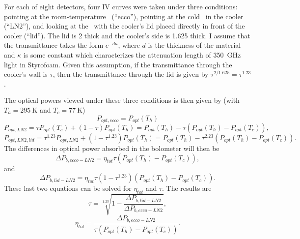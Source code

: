 For each of eight detectors, four IV curves were taken under three conditions: pointing at the room-temperature \ecco\ (``ecco''), pointing at the cold \ecco\ in the cooler (``LN2''), and looking at the \ecco\ with the cooler's lid placed directly in front of the cooler (``lid'').
The lid is \SI{2}{\in} thick and the cooler's side is \SI{1.625}{\in} thick.
I assume that the transmittance takes the form $e^{-d \kappa}$, where $d$ is the thickness of the material and $\kappa$ is some constant which characterizes the attenuation length of \SI{350}{\GHz} light in Styrofoam.
Given this assumption, if the transmittance through the cooler's wall is $\tau$, then the transmittance through the lid is given by $\tau^{2/1.625} = \tau^{1.23}$.

The optical powers viewed under these three conditions is then given by (with $T_h = \SI{295}{\K}$ and $T_c = \SI{77}{\K}$)
\begin{equation}
  P_{opt,ecco} = P_{opt}(T_h)
\end{equation}
\begin{equation}
  P_{opt,LN2} = \tau P_{opt}(T_c) + (1-\tau)P_{opt}(T_h) = P_{opt}(T_h) - \tau (P_{opt}(T_h) - P_{opt}(T_c)),
\end{equation}
\begin{equation}
  P_{opt,LN2,lid} = \tau^{1.23} P_{opt,LN2} + (1-\tau^{1.23})P_{opt}(T_h) = P_{opt}(T_h) - \tau^{2.23}(P_{opt}(T_h) - P_{opt}(T_c)) .
\end{equation}
The differences in optical power absorbed in the bolometer will then be
\begin{equation}
  \Delta P_{b,ecco-LN2} = \eta_{tot} \tau (P_{opt}(T_h) - P_{opt}(T_c)),
\end{equation}
and
\begin{equation}
  \Delta P_{b,lid-LN2} = \eta_{tot} \tau (1-\tau^{1.23}) (P_{opt}(T_h) - P_{opt}(T_c)).
\end{equation}
These last two equations can be solved for $\eta_{tot}$ and $\tau$. The results are
\begin{equation}
   \tau = \sqrt[1.23]{1 - \frac{\Delta P_{b,lid-LN2}}{\Delta P_{b,ecco-LN2}}},
\end{equation}
\begin{equation}
   \eta_{tot} = \frac{\Delta P_{b,ecco-LN2}}{ \tau ( P_{opt}(T_h) - P_{opt}(T_c) )} .
\end{equation}

